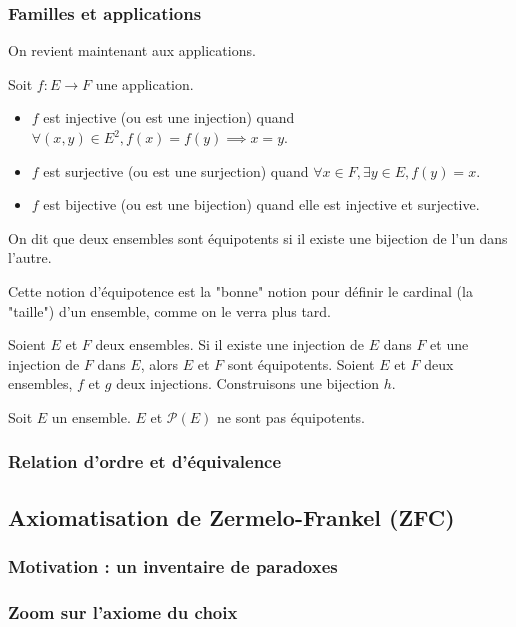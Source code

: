\subsubsection{Familles et applications}

On revient maintenant aux applications.
\begin{defini}
	Soit $f: E \to F$ une application.
	\begin{itemize}
		\item $f$ est injective (ou est une injection) quand $\forall (x,y) \in E^2, f(x)=f(y) \implies x=y$.
		\item $f$ est surjective (ou est une surjection) quand $\forall x \in F, \exists y \in E, f(y)=x$.
		\item $f$ est bijective (ou est une bijection) quand elle est injective et surjective.
	\end{itemize}
\end{defini}

\begin{defini}
	On dit que deux ensembles sont équipotents si il existe une bijection de l'un dans l'autre.
\end{defini}

Cette notion d'équipotence est la "bonne" notion pour définir le cardinal (la "taille") d'un ensemble, comme on le verra plus tard.  

\begin{theoreme}
	Soient $E$ et $F$ deux ensembles. Si il existe une injection de $E$ dans $F$ et une injection de $F$ dans $E$, alors $E$ et $F$ sont équipotents.
	\tcblower
	Soient $E$ et $F$ deux ensembles, $f$ et $g$ deux injections. Construisons une bijection $h$.

	
\end{theoreme}

\begin{theoreme}
	Soit $E$ un ensemble. $E$ et $\mathcal{P}(E)$ ne sont pas équipotents.
\end{theoreme}

\subsubsection{Relation d'ordre et d'équivalence}

\subsection{Axiomatisation de Zermelo-Frankel (ZFC)}
\subsubsection{Motivation : un inventaire de paradoxes}
\subsubsection{Zoom sur l'axiome du choix}

